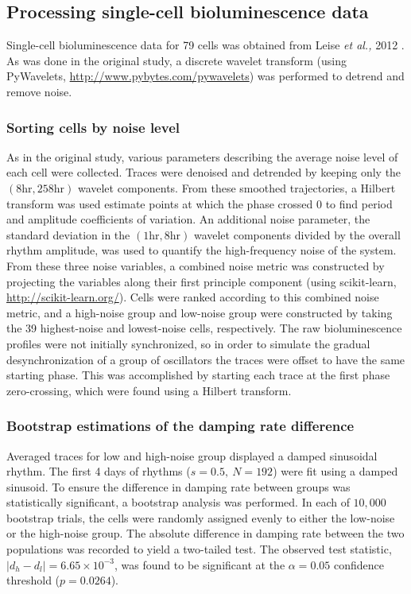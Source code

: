 \documentclass[11pt, letterpaper]{article}
\begin{document}
\subsection*{Processing single-cell bioluminescence data}

Single-cell bioluminescence data for 79 cells was obtained from Leise {\itshape et al.,} 2012 \cite{Leise2012}.
As was done in the original study, a discrete wavelet transform (using PyWavelets, \url{http://www.pybytes.com/pywavelets}) was performed to detrend and remove noise.

\subsubsection*{Sorting cells by noise level}
As in the original study, various parameters describing the average noise level of each cell were collected.
Traces were denoised and detrended by keeping only the $(8 \text{hr}, 258 \text{hr})$ wavelet components.
From these smoothed trajectories, a Hilbert transform was used estimate points at which the phase crossed $0$ to find period and amplitude coefficients of variation.
An additional noise parameter, the standard deviation in the $(1 \text{hr}, 8 \text{hr})$ wavelet components divided by the overall rhythm amplitude, was used to quantify the high-frequency noise of the system.
From these three noise variables, a combined noise metric was constructed by projecting the variables along their first principle component (using scikit-learn, \url{http://scikit-learn.org/}).
Cells were ranked according to this combined noise metric, and a high-noise group and low-noise group were constructed by taking the 39 highest-noise and lowest-noise cells, respectively.
The raw bioluminescence profiles were not initially synchronized, so in order to simulate the gradual desynchronization of a group of oscillators the traces were offset to have the same starting phase. 
This was accomplished by starting each trace at the first phase zero-crossing, which were found using a Hilbert transform.

\subsubsection*{Bootstrap estimations of the damping rate difference}
Averaged traces for low and high-noise group displayed a damped sinusoidal rhythm.
The first 4 days of rhythms ($s = 0.5,\ N = 192$) were fit using a damped sinusoid.
To ensure the difference in damping rate between groups was statistically significant, a bootstrap analysis was performed.
In each of $10,000$ bootstrap trials, the cells were randomly assigned evenly to either the low-noise or the high-noise group.
The absolute difference in damping rate between the two populations was recorded to yield a two-tailed test.
The observed test statistic, $|d_h - d_l| = 6.65\times10^{-3}$, was found to be significant at the $\alpha = 0.05$ confidence threshold ($p = 0.0264$).
\end{document}
